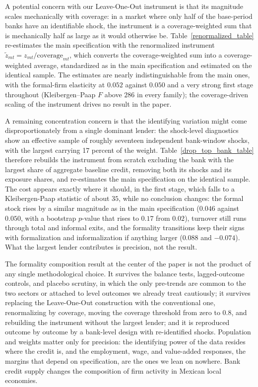 \documentclass[12pt]{article}
\begin{document}
A potential concern with our Leave-One-Out instrument is that its magnitude scales mechanically with coverage: in a market where only half of the base-period banks have an identifiable shock, the instrument is a coverage-weighted sum that is mechanically half as large as it would otherwise be. Table~\ref{renormalized_table} re-estimates the main specification with the renormalized instrument $\tilde z_{mt} = z_{mt}/\text{coverage}_{mt}$, which converts the coverage-weighted sum into a coverage-weighted average, standardized as in the main specification and estimated on the identical sample. The estimates are nearly indistinguishable from the main ones, with the formal-firm elasticity at $0.052$ against $0.050$ and a very strong first stage throughout (Kleibergen--Paap $F$ above $286$ in every family); the coverage-driven scaling of the instrument drives no result in the paper.

A remaining concentration concern is that the identifying variation might come disproportionately from a single dominant lender: the shock-level diagnostics show an effective sample of roughly seventeen independent bank-window shocks, with the largest carrying 17 percent of the weight. Table~\ref{drop_top_bank_table} therefore rebuilds the instrument from scratch excluding the bank with the largest share of aggregate baseline credit, removing both its shocks and its exposure shares, and re-estimates the main specification on the identical sample. The cost appears exactly where it should, in the first stage, which falls to a Kleibergen-Paap statistic of about $35$, while no conclusion changes: the formal stock rises by a similar magnitude as in the main specification ($0.046$ against $0.050$, with a bootstrap $p$-value that rises to $0.17$ from $0.02$), turnover still runs through total and informal exits, and the formality transitions keep their signs with formalization and informalization if anything larger ($0.088$ and $-0.074$). What the largest lender contributes is precision, not the result.

The formality composition result at the center of the paper is not the product of any single methodological choice. It survives the balance tests, lagged-outcome controls, and placebo scrutiny, in which the only pre-trends are common to the two sectors or attached to level outcomes we already treat cautiously; it survives replacing the Leave-One-Out construction with the conventional one, renormalizing by coverage, moving the coverage threshold from zero to $0.8$, and rebuilding the instrument without the largest lender; and it is reproduced outcome by outcome by a bank-level design with re-identified shocks. Population and weights matter only for precision: the identifying power of the data resides where the credit is, and the employment, wage, and value-added responses, the margins that depend on specification, are the ones we lean on nowhere. Bank credit supply changes the composition of firm activity in Mexican local economies.
\end{document}
